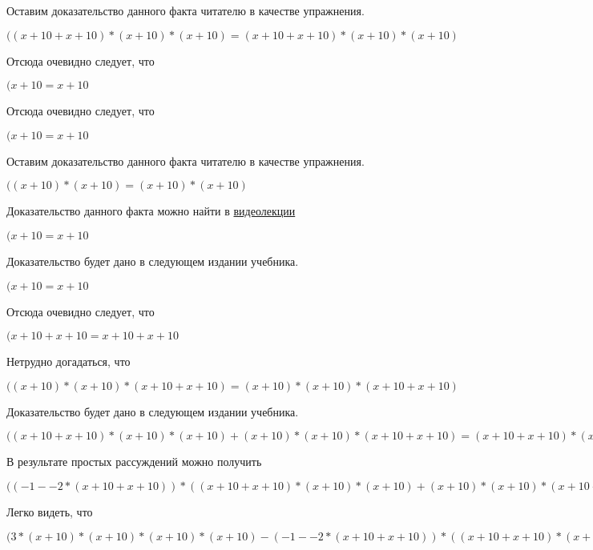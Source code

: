\documentclass[12pt,a4paper,fleqn]{article}
\theoremstyle{definition}
\begin{document}
Оставим доказательство данного факта читателю в качестве упражнения.

$(( x  +  10  +  x  +  10 ) * ( x  +  10 ) * ( x  +  10 ) = ( x  +  10  +  x  +  10 ) * ( x  +  10 ) * ( x  +  10 )$

Отсюда очевидно следует, что

$( x  +  10  =  x  +  10 $

Отсюда очевидно следует, что

$( x  +  10  =  x  +  10 $

Оставим доказательство данного факта читателю в качестве упражнения.

$(( x  +  10 ) * ( x  +  10 ) = ( x  +  10 ) * ( x  +  10 )$

Доказательство данного факта можно найти в \href{https://www.youtube.com/watch?v=dQw4w9WgXcQ}{видеолекции}

$( x  +  10  =  x  +  10 $

Доказательство будет дано в следующем издании учебника.

$( x  +  10  =  x  +  10 $

Отсюда очевидно следует, что

$( x  +  10  +  x  +  10  =  x  +  10  +  x  +  10 $

Нетрудно догадаться, что

$(( x  +  10 ) * ( x  +  10 ) * ( x  +  10  +  x  +  10 ) = ( x  +  10 ) * ( x  +  10 ) * ( x  +  10  +  x  +  10 )$

Доказательство будет дано в следующем издании учебника.

$(( x  +  10  +  x  +  10 ) * ( x  +  10 ) * ( x  +  10 ) + ( x  +  10 ) * ( x  +  10 ) * ( x  +  10  +  x  +  10 ) = ( x  +  10  +  x  +  10 ) * ( x  +  10 ) * ( x  +  10 ) + ( x  +  10 ) * ( x  +  10 ) * ( x  +  10  +  x  +  10 )$

В результате простых рассуждений можно получить

$(( -1  -  -2  * ( x  +  10  +  x  +  10 )) * (( x  +  10  +  x  +  10 ) * ( x  +  10 ) * ( x  +  10 ) + ( x  +  10 ) * ( x  +  10 ) * ( x  +  10  +  x  +  10 )) = ( -1  -  -2  * ( x  +  10  +  x  +  10 )) * (( x  +  10  +  x  +  10 ) * ( x  +  10 ) * ( x  +  10 ) + ( x  +  10 ) * ( x  +  10 ) * ( x  +  10  +  x  +  10 ))$

Легко видеть, что

$( 3  * ( x  +  10 ) * ( x  +  10 ) * ( x  +  10 ) * ( x  +  10 ) - ( -1  -  -2  * ( x  +  10  +  x  +  10 )) * (( x  +  10  +  x  +  10 ) * ( x  +  10 ) * ( x  +  10 ) + ( x  +  10 ) * ( x  +  10 ) * ( x  +  10  +  x  +  10 )) =  3  * ( x  +  10 ) * ( x  +  10 ) * ( x  +  10 ) * ( x  +  10 ) - ( -1  -  -2  * ( x  +  10  +  x  +  10 )) * (( x  +  10  +  x  +  10 ) * ( x  +  10 ) * ( x  +  10 ) + ( x  +  10 ) * ( x  +  10 ) * ( x  +  10  +  x  +  10 ))$
\end{document}
